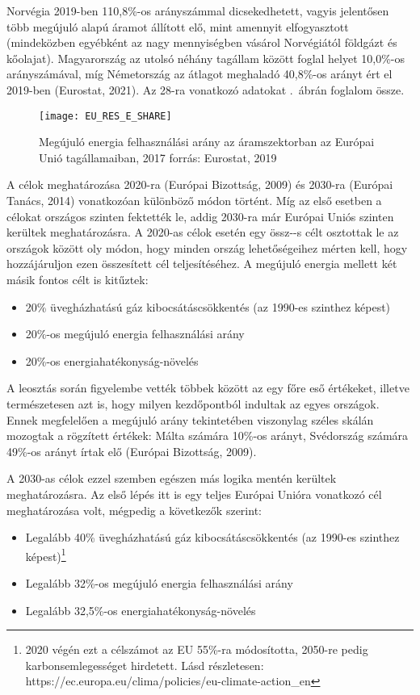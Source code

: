 \documentclass[twoside, magyar, showtrims]{corvinusphd}
\theoremstyle{plain}
\theoremstyle{remark}
\theoremstyle{definition}
\begin{document}
Norvégia 2019-ben 110,8\%-os arányszámmal
dicsekedhetett, vagyis jelentősen több megújuló alapú áramot állított
elő, mint amennyit elfogyasztott (mindeközben egyébként
az  nagy mennyiségben vásárol Norvégiától
földgázt és kőolajat). Magyarország az utolsó
néhány tagállam között foglal helyet
10,0\%-os arányszámával, míg Németország az átlagot
meghaladó 40,8\%-os arányt ért el 2019-ben (Eurostat, 2021).
Az 28-ra vonatkozó adatokat .~ábrán
foglalom össze.

\begin{figure}
    \centering
    \texttt{[image: EU\_RES\_E\_SHARE]}
    \caption{Megújuló energia felhasználási arány az áramszektorban az Európai Unió tagállamaiban, 2017 forrás: Eurostat, 2019}
    \label{fig:EU_RES_E}
\end{figure}

A célok meghatározása 2020-ra (Európai Bizottság, 2009)
és 2030-ra (Európai Tanács, 2014) vonatkozóan különböző módon történt. 
Míg az első esetben a célokat országos szinten fektették le,
addig 2030-ra már Európai Uniós szinten kerültek meghatározásra. 
A 2020-as célok esetén egy össz--s célt osztottak le az országok
között oly módon, hogy minden ország lehetőségeihez mérten 
kell, hogy hozzájáruljon ezen összesített cél teljesítéséhez.
A megújuló energia mellett két másik fontos célt is kitűztek:

\begin{itemize}
    \item
    20\% üvegházhatású gáz kibocsátáscsökkentés (az 1990-es szinthez képest)
    \item
    20\%-os megújuló energia felhasználási arány
    \item
    20\%-os energiahatékonyság-növelés
\end{itemize}

A leosztás során figyelembe vették többek között
az egy főre eső  értékeket, illetve természetesen azt is, 
hogy milyen kezdőpontból indultak az egyes országok.
Ennek megfelelően a megújuló arány tekintetében viszonylag
széles skálán mozogtak a rögzített értékek: Málta számára 10\%-os
arányt, Svédország számára 49\%-os arányt írtak elő (Európai Bizottság, 2009).

A 2030-as célok ezzel szemben egészen más
logika mentén kerültek meghatározásra.
Az első lépés itt is egy teljes Európai Unióra vonatkozó
cél meghatározása volt, mégpedig a következők szerint:

\begin{itemize}
    \item
    Legalább 40\% üvegházhatású gáz kibocsátáscsökkentés (az 1990-es szinthez képest)\footnote{2020 végén ezt a célszámot az EU 55\%-ra módosította, 2050-re pedig karbonsemlegességet hirdetett. Lásd részletesen: https://ec.europa.eu/clima/policies/eu-climate-action\_en}
    \item
    Legalább 32\%-os megújuló energia felhasználási arány
    \item
    Legalább 32,5\%-os energiahatékonyság-növelés
\end{itemize}
\end{document}
